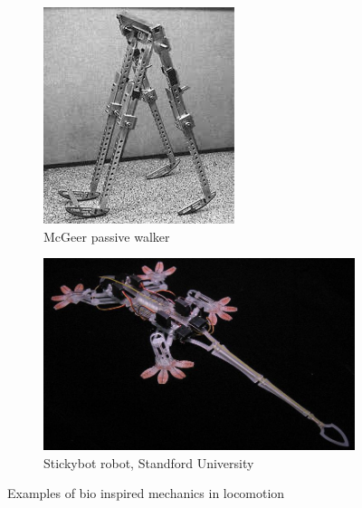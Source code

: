 \begin{figure}[h]
	\centering
	\begin{subfigure}[b]{0.45\textwidth}
        \includegraphics[width=\textwidth]{figures/passive_walker.jpg}
        \caption{McGeer passive walker}
        \label{fig:passive_walker}
    \end{subfigure}
    \begin{subfigure}[b]{0.45\textwidth}
        \includegraphics[width=\textwidth]{figures/Stickybot.jpg}
        \caption{Stickybot robot, Standford University}
        \label{fig:stickybot}
    \end{subfigure}
\caption{Examples of bio inspired mechanics in locomotion}
\label{fig:figure1}
\end{figure}

